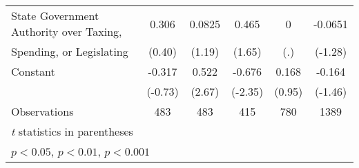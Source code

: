 {\begin{tabular}{l*{5}{c}}
\addlinespace
State Government Authority over Taxing, &0.306         &0.0825         &0.465         &    0         &-0.0651         \\
Spending, or Legislating                &(0.40)         &(1.19)         &(1.65)         &  (.)         &(-1.28)         \\
\addlinespace
Constant                                &-0.317         &0.522\sym{**} &-0.676\sym{*}  &0.168         &-0.164         \\
                                        &(-0.73)         &(2.67)         &(-2.35)         &(0.95)         &(-1.46)         \\
\midrule
Observations                            &  483         &  483         &  415         &  780         & 1389         \\
\bottomrule
\multicolumn{6}{l}{\footnotesize \textit{t} statistics in parentheses}\\
\multicolumn{6}{l}{\footnotesize \sym{*} \(p<0.05\), \sym{**} \(p<0.01\), \sym{***} \(p<0.001\)}\\
\end{tabular}
}
